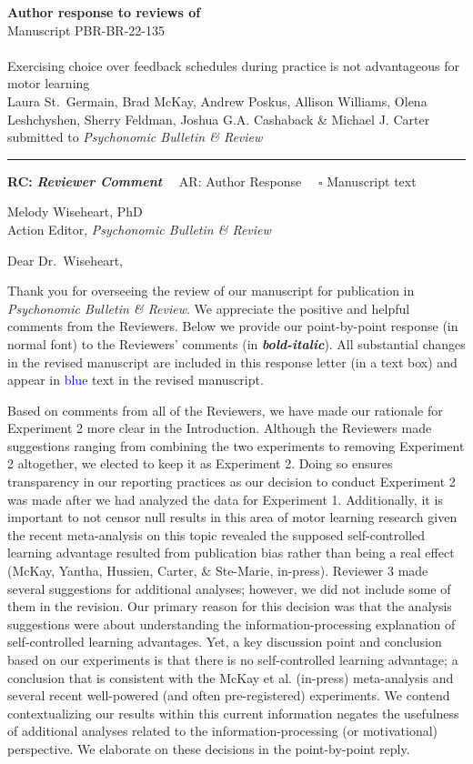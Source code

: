 \documentclass[final]{article}
\begin{document}
{\Large\bf Author response to reviews of}\\[1em]
Manuscript PBR-BR-22-135\\ \\
{\Large Exercising choice over feedback schedules during practice is not advantageous for motor learning}\\[1em]
{Laura St.~Germain, Brad McKay, Andrew Poskus, Allison Williams, Olena Leshchyshen, Sherry Feldman, Joshua G.A. Cashaback \& Michael J. Carter}\\
{submitted to \it Psychonomic Bulletin \& Review }\\
\hrule

\hfill {\bfseries RC:} \textbf{\textit{Reviewer Comment}}\(\quad\) AR: Author Response \(\quad\square\) Manuscript text

\vspace{2em}

Melody Wiseheart, PhD\\
Action Editor, \emph{Psychonomic Bulletin \& Review}

Dear Dr.~Wiseheart,

Thank you for overseeing the review of our manuscript for publication in \emph{Psychonomic Bulletin \& Review}. We appreciate the positive and helpful comments from the Reviewers. Below we provide our point-by-point response (in normal font) to the Reviewers' comments (in \textbf{\emph{bold-italic}}). All substantial changes in the revised manuscript are included in this response letter (in a text box) and appear in \textcolor{blue}{blue} text in the revised manuscript.

Based on comments from all of the Reviewers, we have made our rationale for Experiment 2 more clear in the Introduction. Although the Reviewers made suggestions ranging from combining the two experiments to removing Experiment 2 altogether, we elected to keep it as Experiment 2. Doing so ensures transparency in our reporting practices as our decision to conduct Experiment 2 was made after we had analyzed the data for Experiment 1. Additionally, it is important to not censor null results in this area of motor learning research given the recent meta-analysis on this topic revealed the supposed self-controlled learning advantage resulted from publication bias rather than being a real effect (McKay, Yantha, Hussien, Carter, \& Ste-Marie, in-press). Reviewer 3 made several suggestions for additional analyses; however, we did not include some of them in the revision. Our primary reason for this decision was that the analysis suggestions were about understanding the information-processing explanation of self-controlled learning advantages. Yet, a key discussion point and conclusion based on our experiments is that there is no self-controlled learning advantage; a conclusion that is consistent with the McKay et al. (in-press) meta-analysis and several recent well-powered (and often pre-registered) experiments. We contend contextualizing our results within this current information negates the usefulness of additional analyses related to the information-processing (or motivational) perspective. We elaborate on these decisions in the point-by-point reply.
\end{document}
